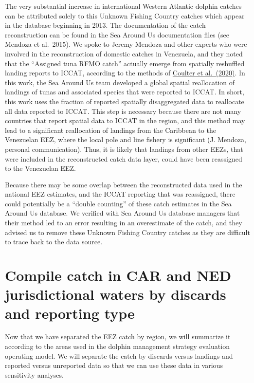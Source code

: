 \documentclass[
  letterpaper,
  oneside,
  open=any]{scrbook}
\begin{document}
The very substantial increase in international Western Atlantic dolphin
catches can be attributed solely to this Unknown Fishing Country catches
which appear in the database beginning in 2013. The documentation of the
catch reconstruction can be found in the Sea Around Us documentation
files (see Mendoza et al.~2015). We spoke to Jeremy Mendoza and other
experts who were involved in the reconstruction of domestic catches in
Venezuela, and they noted that the ``Assigned tuna RFMO catch'' actually
emerge from spatially reshuffled landing reports to ICCAT, according to
the methods of
\href{https://www.sciencedirect.com/science/article/abs/pii/S0165783619302346}{Coulter
et al.~(2020)}. In this work, the Sea Around Us team developed a global
spatial reallocation of landings of tunas and associated species that
were reported to ICCAT. In short, this work uses the fraction of
reported spatially disaggregated data to reallocate all data reported to
ICCAT. This step is necessary because there are not many countries that
report spatial data to ICCAT in the region, and this method may lead to
a significant reallocation of landings from the Caribbean to the
Venezuelan EEZ, where the local pole and line fishery is significant (J.
Mendoza, personal communication). Thus, it is likely that landings from
other EEZs, that were included in the reconstructed catch data layer,
could have been reassigned to the Venezuelan EEZ.

Because there may be some overlap between the reconstructed data used in
the national EEZ estimates, and the ICCAT reporting that was reassigned,
there could potentially be a ``double counting'' of these catch
estimates in the Sea Around Us database. We verified with Sea Around Us
database managers that their method led to an error resulting in an
overestimate of the catch, and they advised us to remove these Unknown
Fishing Country catches as they are difficult to trace back to the data
source.

\section{Compile catch in CAR and NED jurisdictional waters by discards
and reporting
type}\label{compile-catch-in-car-and-ned-jurisdictional-waters-by-discards-and-reporting-type}

Now that we have separated the EEZ catch by region, we will summarize it
according to the areas used in the dolphin management strategy
evaluation operating model. We will separate the catch by discards
versus landings and reported versus unreported data so that we can use
these data in various sensitivity analyses.
\end{document}
